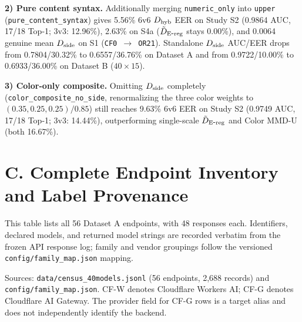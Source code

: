 \textbf{2) Pure content syntax.} Additionally merging \texttt{numeric\_\allowbreak{}only} into \texttt{upper} (\texttt{pure\_\allowbreak{}content\_\allowbreak{}syntax}) gives 5.56\% 6v6 $D_{\mathrm{hyb}}{}$ EER on Study S2 (0.9864 AUC, 17/18 Top-1; 3v3: 12.96\%), 2.63\% on S4a ($\tilde D_{\mathrm{E\mbox{-}reg}}{}$ stays 0.00\%), and 0.0064 genuine mean $D_{\mathrm{side}}{}$ on S1 (\texttt{CF0 \ensuremath{\rightarrow} OR21}). Standalone $D_{\mathrm{side}}{}$ AUC/EER drops from 0.7804/30.32\% to 0.6557/36.76\% on Dataset A and from 0.9722/10.00\% to 0.6933/36.00\% on Dataset B ($40\times 15$).


\textbf{3) Color-only composite.} Omitting $D_{\mathrm{side}}{}$ completely (\texttt{color\_\allowbreak{}composite\_\allowbreak{}no\_\allowbreak{}side}, renormalizing the three color weights to $(0.35, 0.25, 0.25)/0.85$) still reaches 9.63\% 6v6 EER on Study S2 (0.9749 AUC, 17/18 Top-1; 3v3: 14.44\%), outperforming single-scale $\tilde D_{\mathrm{E\mbox{-}reg}}{}$ and Color MMD-U (both 16.67\%).


\section*{C. Complete Endpoint Inventory and Label Provenance}

This table lists all 56 Dataset A endpoints, with 48 responses each. Identifiers, declared models, and returned model strings are recorded verbatim from the frozen API response log; family and vendor groupings follow the versioned \texttt{config/\allowbreak{}family\_\allowbreak{}map.\allowbreak{}json} mapping.


Sources: \texttt{data/\allowbreak{}census\_\allowbreak{}40models.\allowbreak{}jsonl} (56 endpoints, 2,688 records) and \texttt{config/\allowbreak{}family\_\allowbreak{}map.\allowbreak{}json}. CF-W denotes Cloudflare Workers AI; CF-G denotes Cloudflare AI Gateway. The provider field for CF-G rows is a target alias and does not independently identify the backend.


